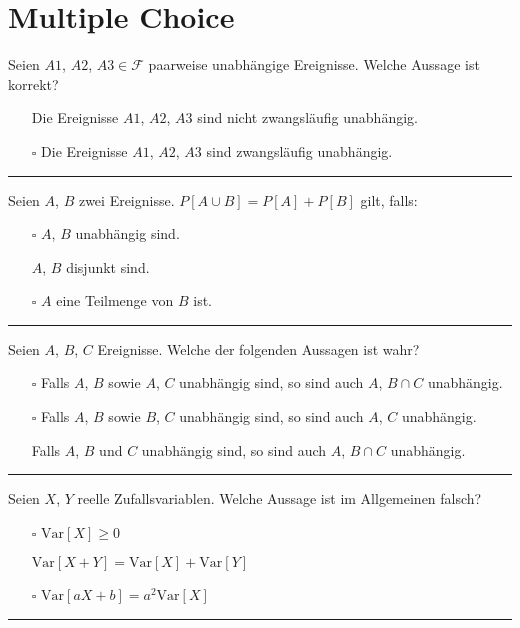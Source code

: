 \newpage
\section{Multiple Choice}
\begin{tiny}
    Seien $A1$, $A2$, $A3 \in \mathcal{F}$ paarweise unabhängige Ereignisse. Welche Aussage ist korrekt?
    \begin{itemize}
        \item[\checkmark] Die Ereignisse $A1$, $A2$, $A3$ sind nicht zwangsläufig unabhängig.
        \item[$\square$] Die Ereignisse $A1$, $A2$, $A3$ sind zwangsläufig unabhängig.
    \end{itemize}
    \rule{\linewidth}{0.4pt}

    Seien $A$, $B$ zwei Ereignisse. $P[A \cup B] = P[A] + P[B]$ gilt, falls:
    \begin{itemize}
        \item[$\square$] $A$, $B$ unabhängig sind.
        \item[\checkmark] $A$, $B$ disjunkt sind.
        \item[$\square$] $A$ eine Teilmenge von $B$ ist.
    \end{itemize}
    \rule{\linewidth}{0.4pt}

    Seien $A$, $B$, $C$ Ereignisse. Welche der folgenden Aussagen ist wahr?
    \begin{itemize}
        \item[$\square$] Falls $A$, $B$ sowie $A$, $C$ unabhängig sind, so sind auch $A$, $B \cap C$ unabhängig.
        \item[$\square$] Falls $A$, $B$ sowie $B$, $C$ unabhängig sind, so sind auch $A$, $C$ unabhängig.
        \item[\checkmark] Falls $A$, $B$ und $C$ unabhängig sind, so sind auch $A$, $B \cap C$ unabhängig.
    \end{itemize}
    \rule{\linewidth}{0.4pt}

    Seien $X$, $Y$ reelle Zufallsvariablen. Welche Aussage ist im Allgemeinen falsch?
    \begin{itemize}
        \item[$\square$] $\text{Var}[X] \geq 0$
        \item[\checkmark] $\text{Var}[X + Y] = \text{Var}[X] + \text{Var}[Y]$
        \item[$\square$] $\text{Var}[aX + b] = a^2 \text{Var}[X]$
    \end{itemize}
    \rule{\linewidth}{0.4pt}


\end{tiny}
